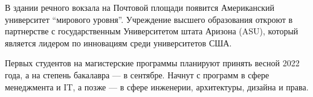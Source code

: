  
 
 
 
 


В здании речного вокзала на Почтовой площади появится Американский университет
\enquote{мирового уровня}. Учреждение высшего образования откроют в партнерстве с
государственным Университетом штата Аризона (ASU), который является лидером по
инновациям среди университетов США.

Первых студентов на магистерские программы планируют принять весной 2022 года,
а на степень бакалавра — в сентябре. Начнут с программ в сфере менеджмента и
IT, а позже — в сфере инженерии, архитектуры, дизайна и права.
